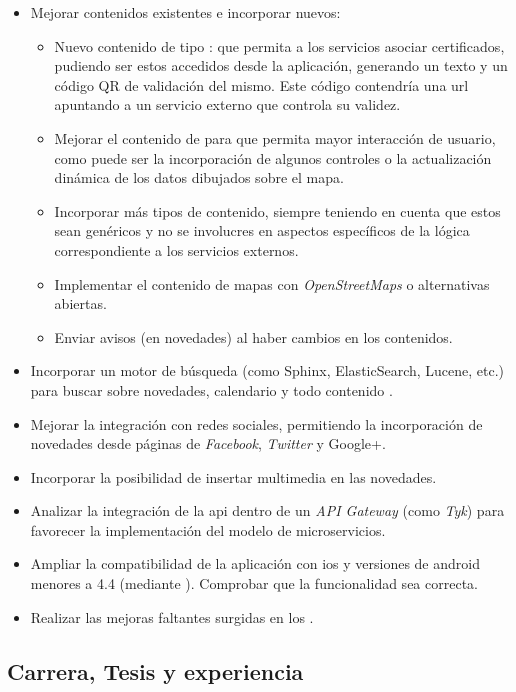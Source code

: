 \begin{itemize}
\item Mejorar contenidos existentes e incorporar nuevos:
\begin{itemize}
\item Nuevo contenido de tipo : que permita a los servicios asociar certificados, pudiendo ser estos accedidos desde la aplicación, generando un texto y un código QR de validación del mismo. Este código contendría una \gls{url} apuntando a un servicio externo que controla su validez. 
\item Mejorar el contenido de  para que permita mayor interacción de usuario, como puede ser la incorporación de algunos controles o la actualización dinámica de los datos dibujados sobre el mapa.
\item Incorporar más tipos de contenido, siempre teniendo en cuenta que estos sean genéricos y no se involucres en aspectos específicos de la lógica correspondiente a los servicios externos.
\item Implementar el contenido de mapas con \textit{OpenStreetMaps} o alternativas abiertas.
\item Enviar avisos (en novedades) al haber cambios en los contenidos.
\end{itemize}
\item Incorporar un motor de búsqueda (como Sphinx, ElasticSearch, Lucene, etc.) para buscar sobre novedades, calendario y todo contenido .
\item Mejorar la integración con redes sociales, permitiendo la incorporación de novedades desde páginas de \textit{Facebook}, \textit{Twitter} y Google+.
\item Incorporar la posibilidad de insertar multimedia en las novedades.
\item Analizar la integración de la \gls{api} dentro de un \textit{API Gateway} (como \textit{Tyk}) para favorecer la implementación del modelo de microservicios.
\item Ampliar la compatibilidad de la aplicación con \gls{ios} y versiones de \gls{android} menores a 4.4 (mediante ). Comprobar que la funcionalidad sea correcta.
\item Realizar las mejoras faltantes surgidas en los .
\end{itemize}

\subsection{Carrera, Tesis y experiencia}
\label{conclusion_carrera}


